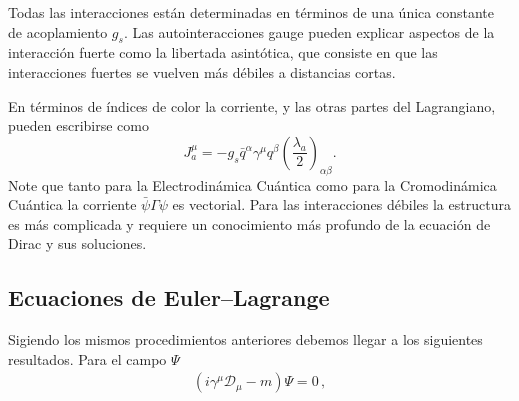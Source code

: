 Todas las interacciones están determinadas en términos de una única constante de acoplamiento $g_s$. Las autointeracciones gauge pueden explicar aspectos de la interacción fuerte como la libertada asintótica, que consiste en que las interacciones fuertes se vuelven más débiles a distancias cortas. 

En términos de índices de color la corriente, y las otras partes del Lagrangiano, pueden escribirse como
\begin{equation}
  \label{eq:223qft}
  J^\mu_a=-g_s\bar{q}^\alpha\gamma^\mu q^\beta\left(\frac{\lambda_a}{2}\right)_{\alpha\beta}.
\end{equation}
Note que tanto para la Electrodinámica Cuántica como para la Cromodinámica Cuántica la corriente $\bar{\psi}\Gamma\psi$ es vectorial. Para las interacciones débiles la estructura es más complicada y requiere un conocimiento más profundo de la ecuación de Dirac y sus soluciones.


\subsection{Ecuaciones de Euler--Lagrange}
\label{sec:ecuaciones-de-euler-1}
Sigiendo los mismos procedimientos anteriores debemos llegar a los siguientes resultados. Para el campo $\Psi$
\begin{align}
  (i\gamma^\mu\mathcal{D}_\mu-m)\Psi=0\,,
\end{align}

